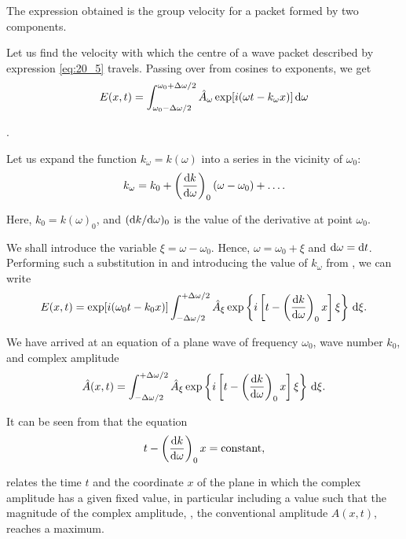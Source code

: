 \noindent
The expression obtained is the group velocity for a packet formed by two components.

Let us find the velocity with which the centre of a wave packet described by expression \eqref{eq:20_5} travels.
Passing over from cosines to exponents, we get
\begin{equation}\label{eq:20_9}
	E(x,t) = \int_{\omega_0-\Delta\omega/2}^{\omega_0+\Delta\omega/2} \hat{A}_{\omega} \exp[i(\omega t - k_{\omega}x)]\, \mathrm{d}\omega
\end{equation}

\noindent
[$\hat{A}_{\omega} = A_{\omega}\exp(i\alpha_{\omega})$ is the complex amplitude].

Let us expand the function $k_{\omega}=k(\omega)$ into a series in the vicinity of $\omega_0$:
\begin{equation}\label{eq:20_10}
	k_{\omega} = k_0 + \left(\dfrac{\mathrm{d} k}{\mathrm{d}\omega}\right)_0 (\omega - \omega_0) + \ldots .
\end{equation}

\noindent
Here, $k_0=k(\omega)_0$, and $(\mathrm{d} k/\mathrm{d}\omega)_0$ is the value of the derivative at point $\omega_0$.

We shall introduce the variable $\xi=\omega-\omega_0$.
Hence, $\omega=\omega_0+\xi$ and $\mathrm{d}\omega = \mathrm{d} t$.
Performing such a substitution in  and introducing the value of $k_{\omega}$ from , we can write
\begin{equation}\label{eq:20_11}
	E(x,t) = \exp[i(\omega_0 t - k_0 x)] \int_{-\Delta\omega/2}^{+\Delta\omega/2} \hat{A}_{\xi} \exp\left\{i \left[ t - \left(\dfrac{\mathrm{d} k}{\mathrm{d}\omega}\right)_0 x \right] \xi\right\}\, \mathrm{d}\xi.
\end{equation}

\noindent
We have arrived at an equation of a plane wave of frequency $\omega_0$, wave number $k_0$, and complex amplitude
\begin{equation}\label{eq:20_12}
	\hat{A}(x,t) = \int_{-\Delta\omega/2}^{+\Delta\omega/2} \hat{A}_{\xi} \exp\left\{i \left[ t - \left(\dfrac{\mathrm{d} k}{\mathrm{d}\omega}\right)_0 x \right] \xi\right\}\, \mathrm{d}\xi.
\end{equation}

\noindent
It can be seen from  that the equation
\begin{equation}\label{eq:20_13}
	t - \left(\dfrac{\mathrm{d} k}{\mathrm{d}\omega}\right)_0 x = \text{constant},
\end{equation}

\noindent
relates the time $t$ and the coordinate $x$ of the plane in which the complex amplitude has a given fixed value, in particular including a value such that the magnitude of the complex amplitude, \ie, the conventional amplitude $A(x,t)$, reaches a maximum.

